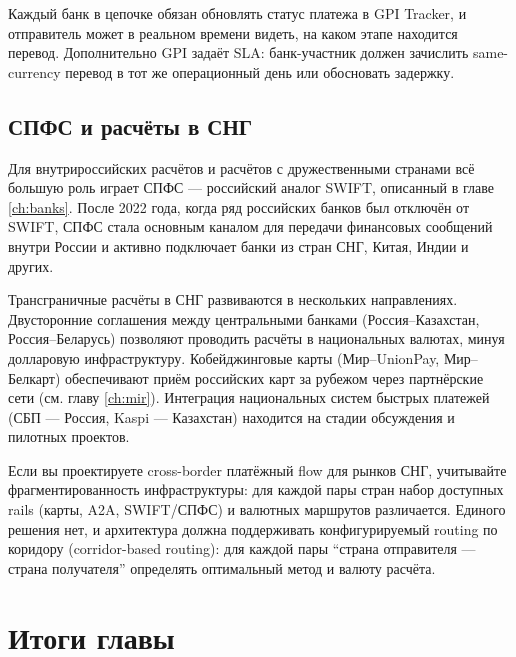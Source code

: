 Каждый банк в цепочке обязан обновлять статус платежа
в GPI Tracker, и отправитель может в реальном времени видеть,
на каком этапе находится перевод. Дополнительно GPI задаёт SLA:
банк-участник должен зачислить same-currency перевод в тот же
операционный день или обосновать задержку.

\subsection*{СПФС и расчёты в СНГ}

Для внутрироссийских расчётов и расчётов с дружественными
странами всё большую роль играет СПФС — российский аналог
SWIFT, описанный в главе \ref{ch:banks}. После 2022 года,
когда ряд российских банков был отключён от SWIFT, СПФС стала
основным каналом для передачи финансовых сообщений внутри
России и активно подключает банки из стран СНГ, Китая, Индии
и других.

Трансграничные расчёты в СНГ развиваются в нескольких
направлениях. Двусторонние соглашения между центральными
банками (Россия--Казахстан, Россия--Беларусь) позволяют
проводить расчёты в национальных валютах, минуя долларовую
инфраструктуру. Кобейджинговые карты (Мир--UnionPay,
Мир--Белкарт) обеспечивают приём российских карт за рубежом
через партнёрские сети (см. главу \ref{ch:mir}). Интеграция
национальных систем быстрых платежей (СБП — Россия,
Kaspi — Казахстан) находится на стадии обсуждения
и пилотных проектов.

\begin{kaobox}[title=На практике]
  Если вы проектируете cross-border платёжный flow
  для рынков СНГ, учитывайте фрагментированность
  инфраструктуры: для каждой пары стран набор доступных
  rails (карты, A2A, SWIFT/СПФС) и валютных маршрутов
  различается. Единого решения нет, и архитектура должна
  поддерживать конфигурируемый routing по коридору
  (corridor-based routing): для каждой пары
  \enquote{страна отправителя — страна получателя}
  определять оптимальный метод и валюту расчёта.
\end{kaobox}

\section*{Итоги главы}

